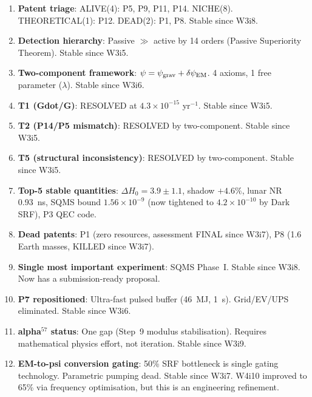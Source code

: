 \documentclass[11pt]{article}
\newcommand{\ee}[1]{\times 10^{#1}}
\begin{document}
\begin{enumerate}
\item \textbf{Patent triage}: ALIVE(4): P5, P9, P11, P14. NICHE(8).
  THEORETICAL(1): P12. DEAD(2): P1, P8. Stable since W3i8.

\item \textbf{Detection hierarchy}: Passive $\gg$ active by 14 orders
  (Passive Superiority Theorem). Stable since W3i5.

\item \textbf{Two-component framework}: $\psi = \psi_{\rm grav} +
  \delta\psi_{\rm EM}$. 4 axioms, 1 free parameter ($\lambda$).
  Stable since W3i6.

\item \textbf{T1 (Gdot/G)}: RESOLVED at $4.3\ee{-15}$ yr$^{-1}$.
  Stable since W3i5.

\item \textbf{T2 (P14/P5 mismatch)}: RESOLVED by two-component.
  Stable since W3i5.

\item \textbf{T5 (structural inconsistency)}: RESOLVED by two-component.
  Stable since W3i5.

\item \textbf{Top-5 stable quantities}: $\Delta H_0 = 3.9 \pm 1.1$,
  shadow $+4.6\%$, lunar NR 0.93~ns, SQMS bound $1.56\ee{-9}$
  (now tightened to $4.2\ee{-10}$ by Dark SRF), P3 QEC code.

\item \textbf{Dead patents}: P1 (zero resources, assessment FINAL since
  W3i7), P8 (1.6 Earth masses, KILLED since W3i7).

\item \textbf{Single most important experiment}: SQMS Phase~I.
  Stable since W3i8. Now has a submission-ready proposal.

\item \textbf{P7 repositioned}: Ultra-fast pulsed buffer (46~MJ, 1~s).
  Grid/EV/UPS eliminated. Stable since W3i6.

\item \textbf{alpha$^{57}$ status}: One gap (Step~9 modulus stabilisation).
  Requires mathematical physics effort, not iteration. Stable since W3i9.

\item \textbf{EM-to-psi conversion gating}: 50\% SRF bottleneck is
  single gating technology. Parametric pumping dead. Stable since W3i7.
  W4i10 improved to 65\% via frequency optimisation, but this is an
  engineering refinement.
\end{enumerate}
\end{document}
